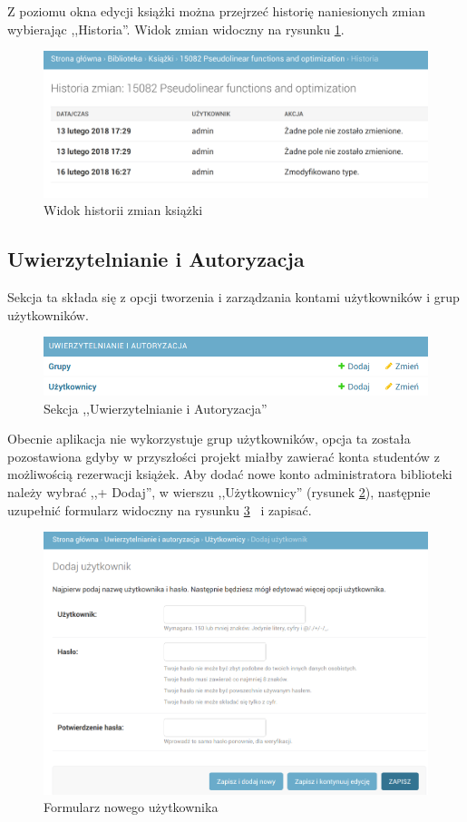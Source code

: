 \documentclass[twoside]{projektInzynierskiMS}
\begin{document}
Z poziomu okna edycji książki można przejrzeć historię naniesionych zmian wybierając ,,Historia''. Widok zmian widoczny na rysunku \ref{fig:adminBookHistory}.

\begin{figure}[h]
  \centering
  \includegraphics[width=0.6\linewidth]{img/backend/HistoriaZmian.png}
  \caption{Widok historii zmian książki}
  \label{fig:adminBookHistory}
\end{figure}


\subsection{Uwierzytelnianie i Autoryzacja}
Sekcja ta składa się z opcji tworzenia i zarządzania kontami użytkowników i grup użytkowników.

\begin{figure}[h]
  \centering
  \includegraphics[width=0.6\linewidth]{img/backend/autoryzacja.png}
  \caption{Sekcja ,,Uwierzytelnianie i Autoryzacja''}
  \label{fig:authSection}
\end{figure}

 Obecnie aplikacja nie wykorzystuje grup użytkowników, opcja ta została pozostawiona gdyby w przyszłości projekt miałby zawierać konta studentów z możliwością rezerwacji książek. Aby dodać nowe konto administratora biblioteki należy wybrać ,,+ Dodaj'', w wierszu ,,Użytkownicy'' (rysunek \ref{fig:authSection}), następnie uzupełnić formularz widoczny na rysunku \ref{fig:newUserForm} ~i zapisać.

\begin{figure}[h]
  \centering
  \includegraphics[width=0.6\linewidth]{img/backend/NowyAdminForm.png}
  \caption{Formularz nowego użytkownika}
  \label{fig:newUserForm}
\end{figure}
\end{document}
